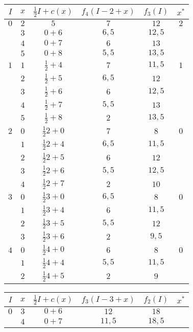 \documentclass[MIOP.tex]{subfiles}
\begin{document}
\begin{solucion}
\begin{tabular}{|c| c| c| c | c| c|}
\hline
$I$ & $x$ & $\frac{1}{2}I+c(x)$ & $f_4(I-2+x)$ &  $f_3(I)$ & $x^* $ \\
\hline
$0$ & $2$ & $5$ & $7$  & $12$& $\boxed{2}$\\
\hline
 & $3$ & $0+6$ &$6,5$ & $12,5$ &\\
\hline
 & $4$ & $0+7$ & $6$ & $13$&\\
\hline
 & $5$ & $0+8$ & $5,5$ & $13,5$ & \\
\hline
\hline
$1$ & $1$ & $\frac{1}{2}+4$ & $7$  & $11,5$& $\boxed{1}$\\
\hline
 & $2$ & $\frac{1}{2}+5$ &$6,5$ & $12$ &\\
\hline
 & $3$ & $\frac{1}{2}+6$ & $6$ & $12,5$&\\
\hline
 & $4$ & $\frac{1}{2}+7$ & $5,5$ & $13$ & \\
\hline
 & $5$ & $\frac{1}{2}+8$ & $2$ & $13,5$ & \\
\hline
\hline
$2$ & $0$ & $\frac{1}{2}2+0$ & $7$  & $8$& $\boxed{0}$\\
\hline
 & $1$ & $\frac{1}{2}2+4$ &$6,5$ & $11,5$ &\\
\hline
 & $2$ & $\frac{1}{2}2+5$ &$6$ & $12$ &\\
\hline
 & $3$ & $\frac{1}{2}2+6$ & $5,5$ & $12,5$&\\
\hline
 & $4$ & $\frac{1}{2}2+7$ & $2$ & $10$ & \\
\hline
\hline
$3$ & $0$ & $\frac{1}{2}3+0$ & $6,5$  & $8$ & $\boxed{0}$\\
\hline
 & $1$ & $\frac{1}{2}3+4$ &$6$ & $11,5$ &\\
\hline
 & $2$ & $\frac{1}{2}3+5$ &$5,5$ & $12$ &\\
\hline
 & $3$ & $\frac{1}{2}3+6$ & $2$ & $9,5$&\\
 \hline
 \hline
 $4$ & $0$ & $\frac{1}{2}4+0$ & $6$  & $8$& $\boxed{0}$\\
\hline
 & $1$ & $\frac{1}{2}4+4$ &$5,5$ & $11,5$ &\\
\hline
 & $2$ & $\frac{1}{2}4+5$ &$2$ & $9$ &\\
 \hline
\end{tabular}\quad 
\begin{tabular}{|c| c| c| c | c| c|}
\hline
$I$ & $x$ & $\frac{1}{2}I+c(x)$ & $f_3(I-3+x)$ &  $f_2(I)$ & $x^* $ \\
\hline
$0$ & $3$ & $0+6$ &  $12$  & $18$& \\
\hline
 & $4$ & $0+7$ &$11,5$ & $18,5$ &\\
\hline

\end{tabular}
\end{solucion}
\end{document}
